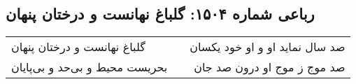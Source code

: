 \begin{center}
\section*{رباعی شماره ۱۵۰۴: گلباغ نهانست و درختان پنهان}
\label{sec:1504}
\begin{longtable}{l p{0.5cm} r}
گلباغ نهانست و درختان پنهان
&&
صد سال نماید او و او خود یکسان
\\
بحریست محیط و بی‌حد و بی‌پایان
&&
صد موج ز موج او درون صد جان
\\
\end{longtable}
\end{center}
